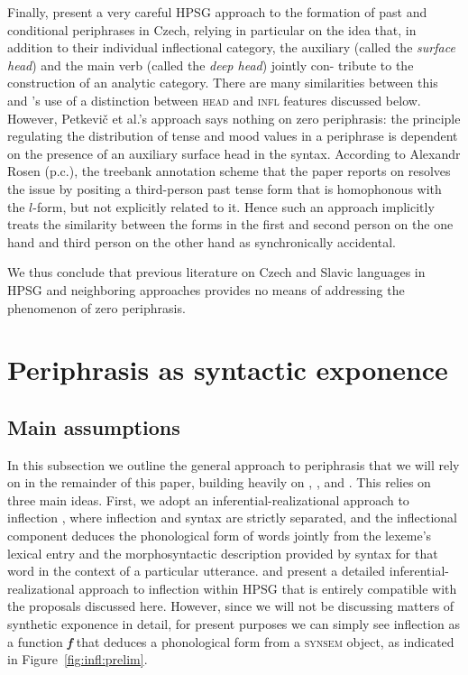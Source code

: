 \documentclass[output=paper]{langsci/langscibook}
\begin{document}
Finally, \citet{Petkevic15} present a very careful HPSG approach to the formation of past and conditional periphrases in Czech, relying in particular on the idea that, in addition to their individual inflectional category, the auxiliary (called the \emph{surface head}) and the main verb (called the \emph{deep head}) jointly con- tribute to the construction of an analytic category. There are many similarities between this and \citeauthor{Bonami14d}’s \citeyear{Bonami14d} use of a distinction between \textsc{head} and \textsc{infl} features discussed below. However,  Petkevič et al.’s approach  says nothing on zero periphrasis: the principle regulating the distribution of tense and mood values in a periphrase is dependent on the presence of an auxiliary surface head in the syntax. According to Alexandr Rosen (p.c.), the treebank annotation scheme that the paper reports on resolves the issue by positing a third-person past tense form that is homophonous with the $l$-form, but not explicitly related to it. Hence such an approach implicitly treats the similarity  between the forms in the first and second person on the one hand and third person on the other hand as synchronically accidental. 

We thus conclude that previous literature on Czech and Slavic languages in HPSG and neighboring approaches provides no means of addressing the phenomenon of zero periphrasis.

\section{Periphrasis as syntactic exponence}
\label{sec:ana}

\subsection{Main assumptions}

In this subsection we outline the general approach to periphrasis that we will rely on in the remainder of this paper, building heavily on  \citet{Bonami13}, \citet{Bonami14d}, and \citet{Bonami16b}. This relies on three main ideas. First, we adopt an inferential-realizational approach to inflection \citep{Matthews72,Zwicky85,Anderson92,Aronoff94,Stump01}, where inflection and syntax are strictly separated, and the inflectional component deduces the phonological form of words jointly from the lexeme's lexical entry and the morphosyntactic description provided by syntax for that word in the context of a particular utterance. \citet{Crysmann14} and \citet{Bonami15b} present a detailed inferential-realizational approach to inflection within HPSG that is entirely compatible with the proposals discussed here. However, since we will not be discussing matters of synthetic exponence in detail, for present purposes we can simply see inflection as a function \textit{\textbf{f}} that deduces a phonological form from a \textsc{synsem} object, as indicated in Figure~\ref{fig:infl:prelim}.
\end{document}
